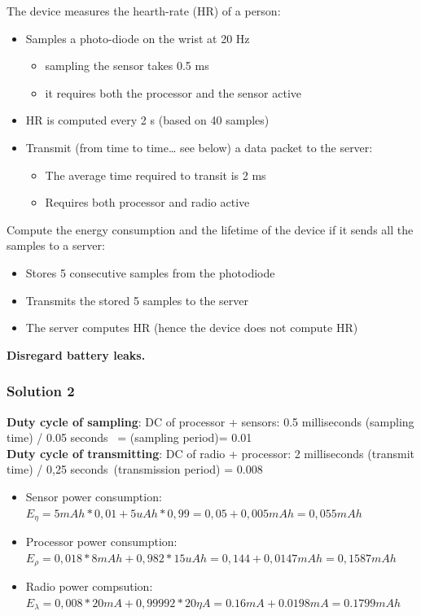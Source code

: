 The device measures the hearth-rate (HR) of a person:
\begin{itemize}
	\item 
	Samples a photo-diode on the wrist at 20 Hz
	\begin{itemize}
		\item 
		sampling the sensor takes 0.5 ms
		\item 
		it requires both the processor and the sensor active
	\end{itemize}
	\item 
	HR is computed every 2 s (based on 40 samples)
	\item 
	Transmit (from time to time… see below) a data packet to the server:
	\begin{itemize}
		\item 
		The average time required to transit is 2 ms
		\item 
		Requires both processor and radio active
		
	\end{itemize}
\end{itemize}
Compute the energy consumption and the lifetime of the device if it sends all the samples to a server:
\begin{itemize}
	\item 
	Stores 5 consecutive samples from the photodiode
	\item 
	Transmits the stored 5 samples to the server
	\item 
	The server computes HR (hence the device does not compute HR)

\end{itemize}
\textbf{	Disregard battery leaks.}
\subsubsection{Solution 2}\label{sec:solution-2}
\textbf{Duty cycle of sampling}: DC of processor + sensors: 0.5 milliseconds (sampling time) / 0.05 seconds  = (sampling period)= 0.01\\

\textbf{Duty cycle of transmitting}: DC of radio + processor: 2 milliseconds (transmit time) / 0,25 seconds (transmission period) = 0.008
\begin{itemize}
	\item Sensor power consumption:
	$E_{\eta} = 5 mAh * 0,01+ 5 uAh *0,99 =0,05+0,005 mAh = 0,055 mAh$
	\item Processor power consumption:
	$E_{\rho}=0,018*8 mAh + 0,982*15 uAh =0,144+0,0147 mAh = 0,1587 mAh$
	\item Radio power compsution:
	$E_{\lambda}=0,008*20 mA + 0,99992*20\eta A = 0.16 mA + 0.0198 mA = 0.1799 mAh$
\end{itemize}

